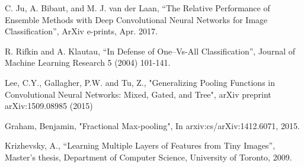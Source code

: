 \documentclass[10pt,twocolumn,letterpaper]{article}
\begin{document}
{\small
\begin{thebibliography}{9}
C. Ju, A. Bibaut, and M. J. van der Laan, “The Relative Performance of Ensemble Methods with Deep Convolutional Neural Networks for Image Classification”, ArXiv e-prints, Apr. 2017.

R. Rifkin and A. Klautau, “In Defense of One–Vs-All
Classification”, Journal of Machine Learning Research 5
(2004) 101-141.

Lee, C.Y., Gallagher, P.W. and Tu, Z., "Generalizing Pooling Functions in Convolutional Neural Networks: Mixed, Gated, and Tree", arXiv preprint arXiv:1509.08985 (2015) 

Graham, Benjamin, "Fractional Max-pooling", In arxiv:cs/arXiv:1412.6071, 2015.

Krizhevsky, A., “Learning Multiple Layers of Features from Tiny Images”, Master’s thesis, Department of Computer Science, University of Toronto, 2009.

\end{thebibliography}
}
\end{document}
